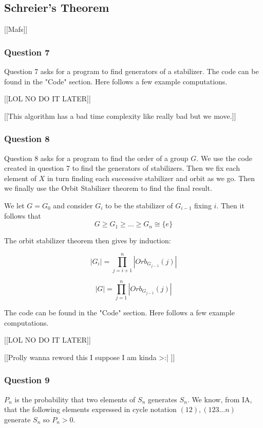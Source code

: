 \documentclass{article}
\begin{document}
\subsection{Schreier's Theorem}

[[Mafs]]

\subsubsection{Question 7}
Question 7 asks for a program to find generators of a stabilizer.
The code can be found in the "Code" section. Here follows a few example computations.

	[[LOL NO DO IT LATER]]

	[[This algorithm has a bad time complexity like really bad but we move.]]



\subsubsection{Question 8}
Question 8 asks for a program to find the order of a group $G$.
We use the code created in question 7 to find the generators of stabilizers.
Then we fix each element of $X$ in turn finding each successive stabilizer and orbit as we go.
Then we finally use the Orbit Stabilizer theorem to find the final result.

\vspace{5mm}

We let $G = G_0$ and consider $G_i$ to be the stabilizer of $G_{i-1}$ fixing $i$. Then it follows that
$$G \geq G_1 \geq \dots \geq G_n \cong \{ e \}$$

The orbit stabilizer theorem then gives by induction:

$$|G_{i}| = \prod_{j=i+1}^{n} |Orb_{G_{j-1}}(j)|$$

$$|G| = \prod_{j = 1}^{n} |Orb_{G_{j-1}}(j)|$$

\vspace{5mm}

The code can be found in the "Code" section. Here follows a few example computations.

	[[LOL NO DO IT LATER]]

	[[Prolly wanna reword this I suppose I am kinda >:| ]]



\subsubsection{Question 9}
$P_n$ is the probability that two elements of $S_n$ generates $S_n$. We know, from IA, that the following elements expressed in cycle notation $(1 2), (1 2 3 \dots n)$ generate $S_n$ so $P_n > 0$.
\end{document}
